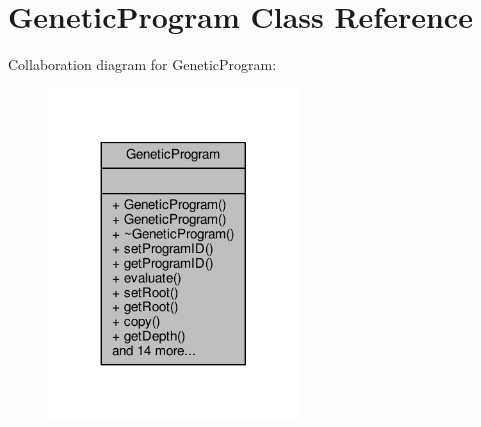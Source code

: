 \hypertarget{classGeneticProgram}{}\section{Genetic\+Program Class Reference}
\label{classGeneticProgram}


Collaboration diagram for Genetic\+Program\+:
\nopagebreak
\begin{figure}[H]
\begin{center}
\leavevmode
\includegraphics[width=188pt]{classGeneticProgram__coll__graph}
\end{center}
\end{figure}
